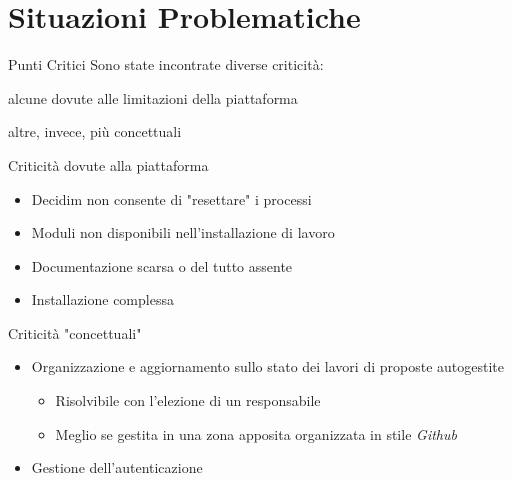 \section{Situazioni Problematiche}

\begin{frame}{Punti Critici}
  Sono state incontrate diverse criticità:

  alcune dovute alle limitazioni della piattaforma

  altre, invece, più concettuali
\end{frame}
\begin{frame}{Criticità dovute alla piattaforma}
  \begin{itemize}[<+- | alert@+>]

    \item Decidim non consente di "resettare" i processi
    \item Moduli non disponibili nell'installazione di lavoro
    \item Documentazione scarsa o del tutto assente
    \item Installazione complessa
  \end{itemize}
  \centering

\end{frame}
\begin{frame}{Criticità "concettuali"}
  \begin{itemize}[<+- | alert@+>]
    \item Organizzazione e aggiornamento sullo stato dei lavori di proposte autogestite
          \begin{itemize}
            \item Risolvibile con l'elezione di un responsabile
            \item Meglio se gestita in una zona apposita organizzata in stile \emph{Github}
          \end{itemize}


    \item Gestione dell'autenticazione
  \end{itemize}

\end{frame}
